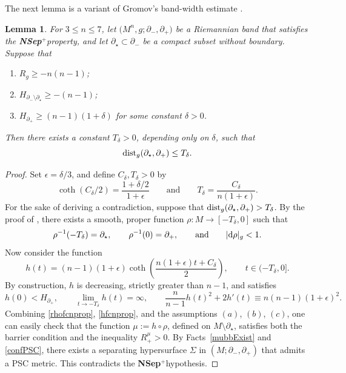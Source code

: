 \documentclass[10pt,a4paper]{amsart}
\numberwithin{equation}{section}
\newtheorem{Lemma}[Theorem]{Lemma}
\def\ed{{\rm d}}
\def\dist{{\rm dist}}
\def\Nsep{\textbf{\textup{NSep}$^+$}}
\begin{document}
The next lemma is a variant of Gromov's band-width estimate \cite[Section 5.3]{Gr2021}.

\begin{Lemma}\label{bandWidth}
	For $3\le n\le 7$, let $\big(M^n,g;\partial_-,\partial_+\big)$ be a Riemannian band that satisfies
	the \Nsep property, and let
	$\partial_\star\subset \partial_-$ be a compact subset without boundary.
	Suppose that
	\begin{enumerate}\itemsep=0pt
		\item[$(a)$] $R_g \ge -n(n-1)$;
		\item[$(b)$] $H_{\partial_-\setminus\partial_\star} \ge -(n-1)$;
		\item[$(c)$] $H_{\partial_+} \ge (n-1)( 1+ \delta)$ for some constant $\delta>0$.
	\end{enumerate}
	Then there exists a constant $T_\delta>0$, depending only on $\delta$, such that
	\begin{equation*}%
		\dist_g(\partial_\star,\partial_+)
		\le T_\delta.
	\end{equation*}	
\end{Lemma}
\begin{proof}
	Set  $\epsilon = \delta/3$,
	and define
	$C_\delta, T_\delta>0$ by
	\[
		  \coth(C_\delta/2) = \frac{1+\delta/2}{1+\epsilon}
		  \qquad\mbox{and}
		  \qquad T_\delta = \frac{C_\delta}{n(1+\epsilon)}.
	\]
	For the sake of deriving a contradiction, suppose that
	$\dist_g(\partial_\star, \partial_+) > T_\delta$.
	By the proof of \cite[Lemma~4.1]{Zhu21warp}, there exists a smooth, proper function
	$\rho\colon M\rightarrow [-T_\delta, 0]$
	such that
	\begin{equation}\label{rhofcnprop}
		\rho^{-1}(-T_\delta) = \partial_\star, \qquad \rho^{-1}(0) = \partial_+,
		\qquad\mbox{and}\qquad |\ed\rho|_g < 1.
	\end{equation}
	Now consider the function
	\[
		h(t)= (n-1)(1+\epsilon)\coth\left(\frac{n(1+\epsilon)t + C_\delta}{2}\right),
		\qquad t\in (-T_\delta, 0].
	\]
	By construction, $h$ is decreasing, strictly greater than $n-1$, and satisfies
	\begin{equation}\label{hfcnprop}
		h(0) < H_{\partial_+}, \qquad \lim_{t\rightarrow -T_\delta} h(t) = \infty,
		\qquad \frac{n}{n-1}h(t)^2 + 2h'(t) \equiv n(n-1)(1+\epsilon)^2.
	\end{equation}
	Combining \eqref{rhofcnprop}, \eqref{hfcnprop}, and the assumptions $(a)$, $(b)$, $(c)$,
	one can easily check that the
	function $\mu:=h\circ\rho$, defined on $M\setminus \partial_\star$,
	satisfies both
	the barrier condition and the inequality $R^\mu_+ >0$.
	By Facts~\ref{mubbExist} and \ref{confPSC}, there exists a separating hypersurface $\Sigma$ in $(M;\partial_-,\partial_+)$ that admits a PSC metric. This contradicts the \Nsep hypothesis.
\end{proof}
\end{document}
